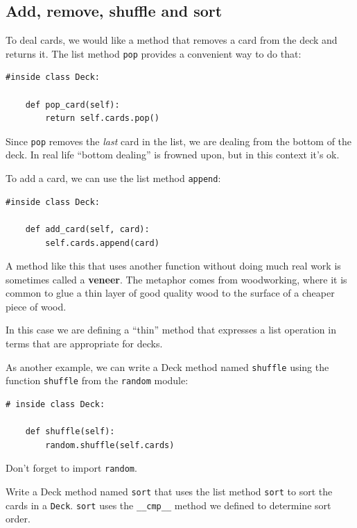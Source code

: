 \documentclass[10pt]{book}
\begin{document}
\begin{CJK}{UTF8}{gbsn}
\section{Add, remove, shuffle and sort}

To deal cards, we would like a method that
removes a card from the deck and returns it.
The list method {\tt pop} provides a convenient way to do that:

\begin{verbatim}
#inside class Deck:

    def pop_card(self):
        return self.cards.pop()
\end{verbatim}
%
Since {\tt pop} removes the {\em last} card in the list, we are
dealing from the bottom of the deck.  In real life ``bottom dealing'' is
frowned upon,
but in this context it's ok.

To add a card, we can use the list method {\tt append}:

\begin{verbatim}
#inside class Deck:

    def add_card(self, card):
        self.cards.append(card)
\end{verbatim}
%
A method like this that uses another function without doing
much real work is sometimes called a {\bf veneer}.  The metaphor
comes from woodworking, where it is common to glue a thin
layer of good quality wood to the surface of a cheaper piece of
wood.

In this case we are defining a ``thin'' method that expresses
a list operation in terms that are appropriate for decks.

As another example, we can write a Deck method named {\tt shuffle}
using the function {\tt shuffle} from the {\tt random} module:

\begin{verbatim}
# inside class Deck:
            
    def shuffle(self):
        random.shuffle(self.cards)
\end{verbatim}
%
Don't forget to import {\tt random}.

\begin{exercise}

Write a Deck method named {\tt sort} that uses the list method
{\tt sort} to sort the cards in a {\tt Deck}.  {\tt sort} uses
the \verb"__cmp__" method we defined to determine sort order.
\end{exercise}




\end{CJK}
\end{document}
